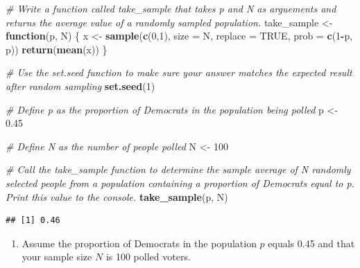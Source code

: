 \documentclass[
]{article}
\newenvironment{Shaded}{\begin{snugshade}}{\end{snugshade}}
\newcommand{\CommentTok}[1]{\textcolor[rgb]{0.56,0.35,0.01}{\textit{#1}}}
\newcommand{\ControlFlowTok}[1]{\textcolor[rgb]{0.13,0.29,0.53}{\textbf{#1}}}
\newcommand{\DataTypeTok}[1]{\textcolor[rgb]{0.13,0.29,0.53}{#1}}
\newcommand{\DecValTok}[1]{\textcolor[rgb]{0.00,0.00,0.81}{#1}}
\newcommand{\FloatTok}[1]{\textcolor[rgb]{0.00,0.00,0.81}{#1}}
\newcommand{\KeywordTok}[1]{\textcolor[rgb]{0.13,0.29,0.53}{\textbf{#1}}}
\newcommand{\NormalTok}[1]{#1}
\newcommand{\OperatorTok}[1]{\textcolor[rgb]{0.81,0.36,0.00}{\textbf{#1}}}
\newcommand{\OtherTok}[1]{\textcolor[rgb]{0.56,0.35,0.01}{#1}}
\newcommand{\StringTok}[1]{\textcolor[rgb]{0.31,0.60,0.02}{#1}}
\providecommand{\tightlist}{%
  \setlength{\itemsep}{0pt}\setlength{\parskip}{0pt}}
\begin{document}
\begin{Shaded}
\begin{Highlighting}[]
\CommentTok{\# Write a function called \textasciigrave{}take\_sample\textasciigrave{} that takes \textasciigrave{}p\textasciigrave{} and \textasciigrave{}N\textasciigrave{} as arguements and returns the average value of a randomly sampled population.}
\NormalTok{take\_sample \textless{}{-}}\StringTok{ }\ControlFlowTok{function}\NormalTok{(p, N) \{}
\NormalTok{  x \textless{}{-}}\StringTok{ }\KeywordTok{sample}\NormalTok{(}\KeywordTok{c}\NormalTok{(}\DecValTok{0}\NormalTok{,}\DecValTok{1}\NormalTok{), }\DataTypeTok{size =}\NormalTok{ N, }\DataTypeTok{replace =} \OtherTok{TRUE}\NormalTok{, }\DataTypeTok{prob =} \KeywordTok{c}\NormalTok{(}\DecValTok{1}\OperatorTok{{-}}\NormalTok{p, p))}
  \KeywordTok{return}\NormalTok{(}\KeywordTok{mean}\NormalTok{(x))}
\NormalTok{\}}

\CommentTok{\# Use the \textasciigrave{}set.seed\textasciigrave{} function to make sure your answer matches the expected result after random sampling}
\KeywordTok{set.seed}\NormalTok{(}\DecValTok{1}\NormalTok{)}

\CommentTok{\# Define \textasciigrave{}p\textasciigrave{} as the proportion of Democrats in the population being polled}
\NormalTok{p \textless{}{-}}\StringTok{ }\FloatTok{0.45}

\CommentTok{\# Define \textasciigrave{}N\textasciigrave{} as the number of people polled}
\NormalTok{N \textless{}{-}}\StringTok{ }\DecValTok{100}

\CommentTok{\# Call the \textasciigrave{}take\_sample\textasciigrave{} function to determine the sample average of \textasciigrave{}N\textasciigrave{} randomly selected people from a population containing a proportion of Democrats equal to \textasciigrave{}p\textasciigrave{}. Print this value to the console.}
\KeywordTok{take\_sample}\NormalTok{(p, N)}
\end{Highlighting}
\end{Shaded}

\begin{verbatim}
## [1] 0.46
\end{verbatim}

\begin{enumerate}
\def\labelenumi{\arabic{enumi}.}
\setcounter{enumi}{1}
\tightlist
\item
  Assume the proportion of Democrats in the population \(p\) equals 0.45
  and that your sample size \(N\) is 100 polled voters.
\end{enumerate}
\end{document}
